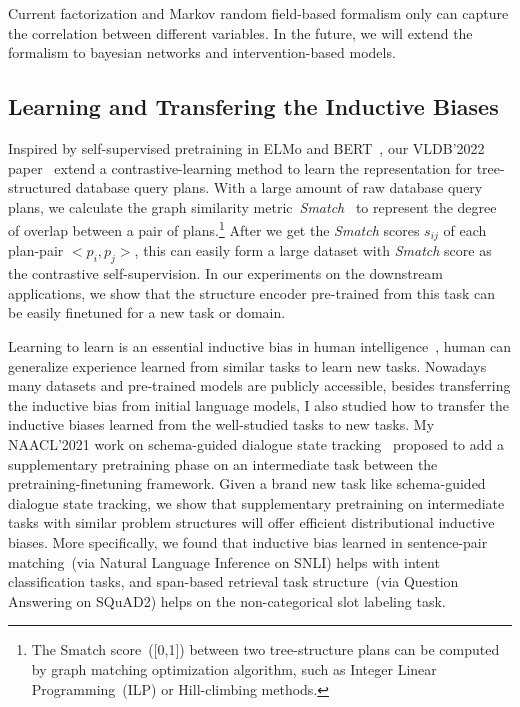  Current factorization and Markov random
field-based formalism only can capture the correlation between
different variables. In the future, we will extend the formalism to
bayesian networks and intervention-based models.

\subsection{Learning and Transfering the Inductive Biases}
\label{ssec:future:bias-learn-transfer}

Inspired by self-supervised pretraining in ELMo and
BERT~\cite{devlin2019bert}, our VLDB'2022
paper~\cite{paul2021database} extend a contrastive-learning method to
learn the representation for tree-structured database query
plans. With a large amount of raw database query plans, we calculate
the graph similarity metric~{\em Smatch}~\cite{Cai:2013wn} to
represent the degree of overlap between a pair of plans.\footnote{The
  Smatch score~([0,1]) between two tree-structure plans can be
  computed by graph matching optimization algorithm, such as Integer
  Linear Programming~(ILP) or Hill-climbing methods.}  After we get
the {\em Smatch} scores $s_{ij}$ of each plan-pair $<p_{i}, p_{j}>$,
this can easily form a large dataset with {\em Smatch} score as the
contrastive self-supervision. In our experiments on the downstream
applications, we show that the structure encoder pre-trained from this
task can be easily finetuned for a new task or domain.

Learning to learn is an essential inductive bias in human
intelligence~\cite{harlow1949formation}, human can generalize
experience learned from similar tasks to learn new tasks. Nowadays
many datasets and pre-trained models are publicly accessible, besides
transferring the inductive bias from initial language models, I also
studied how to transfer the inductive biases learned from the
well-studied tasks to new tasks. My NAACL'2021 work on schema-guided
dialogue state tracking~\cite{cao2021schema} proposed to add a
supplementary pretraining phase on an intermediate task between the
pretraining-finetuning framework. Given a brand new task like
schema-guided dialogue state tracking, we show that supplementary
pretraining on intermediate tasks with similar problem structures will
offer efficient distributional inductive biases. More specifically, we
found that inductive bias learned in sentence-pair matching~(via
Natural Language Inference on SNLI) helps with intent classification
tasks, and span-based retrieval task structure~(via Question Answering
on SQuAD2) helps on the non-categorical slot labeling task.

